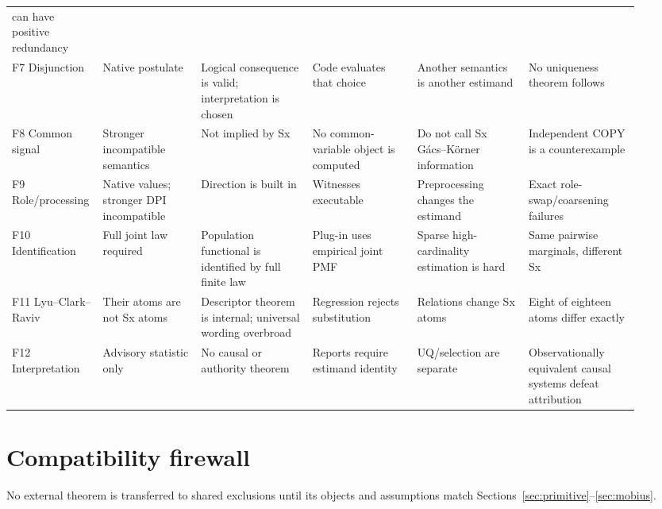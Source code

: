\documentclass[11pt]{article}
\begin{document}
\begin{landscape}
\begin{longtable}{@{}P{0.10\linewidth}P{0.15\linewidth}P{0.17\linewidth}P{0.16\linewidth}P{0.17\linewidth}P{0.17\linewidth}@{}}
can have positive redundancy \\
F7 Disjunction & Native postulate & Logical consequence is valid; interpretation
is chosen & Code evaluates that choice & Another semantics is another estimand
& No uniqueness theorem follows \\
F8 Common signal & Stronger incompatible semantics & Not implied by Sx & No
common-variable object is computed & Do not call Sx G\'acs--K\"orner information
& Independent COPY is a counterexample \\
F9 Role/processing & Native values; stronger DPI incompatible & Direction is
built in & Witnesses executable & Preprocessing changes the estimand & Exact
role-swap/coarsening failures \\
F10 Identification & Full joint law required & Population functional is
identified by full finite law & Plug-in uses empirical joint PMF & Sparse
high-cardinality estimation is hard & Same pairwise marginals, different Sx \\
F11 Lyu--Clark--Raviv & Their atoms are not Sx atoms & Descriptor theorem is
internal; universal wording overbroad & Regression rejects substitution &
Relations change Sx atoms & Eight of eighteen atoms differ exactly \\
F12 Interpretation & Advisory statistic only & No causal or authority theorem &
Reports require estimand identity & UQ/selection are separate & Observationally
equivalent causal systems defeat attribution \\
\bottomrule
\end{longtable}
\normalsize
\endgroup
\end{landscape}

\section{Compatibility firewall}
\label{sec:firewall}

No external theorem is transferred to shared exclusions until its objects and
assumptions match Sections~\ref{sec:primitive}--\ref{sec:mobius}.
\end{document}
